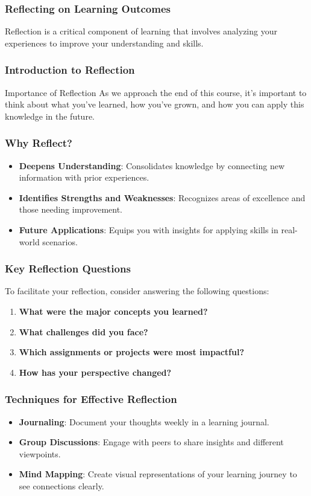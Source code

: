 \documentclass[aspectratio=169]{beamer}
\begin{document}
\begin{frame}[fragile]
  \frametitle{Reflecting on Learning Outcomes}
  Reflection is a critical component of learning that involves analyzing your experiences to improve your understanding and skills.
\end{frame}

\begin{frame}[fragile]
  \frametitle{Introduction to Reflection}
  \begin{block}{Importance of Reflection}
      As we approach the end of this course, it's important to think about what you've learned, how you've grown, and how you can apply this knowledge in the future.
  \end{block}
\end{frame}

\begin{frame}[fragile]
  \frametitle{Why Reflect?}
  \begin{itemize}
      \item \textbf{Deepens Understanding}: Consolidates knowledge by connecting new information with prior experiences.
      \item \textbf{Identifies Strengths and Weaknesses}: Recognizes areas of excellence and those needing improvement.
      \item \textbf{Future Applications}: Equips you with insights for applying skills in real-world scenarios.
  \end{itemize}
\end{frame}

\begin{frame}[fragile]
  \frametitle{Key Reflection Questions}
  To facilitate your reflection, consider answering the following questions:
  \begin{enumerate}
      \item \textbf{What were the major concepts you learned?}
      \item \textbf{What challenges did you face?}
      \item \textbf{Which assignments or projects were most impactful?}
      \item \textbf{How has your perspective changed?}
  \end{enumerate}
\end{frame}

\begin{frame}[fragile]
  \frametitle{Techniques for Effective Reflection}
  \begin{itemize}
      \item \textbf{Journaling}: Document your thoughts weekly in a learning journal.
      \item \textbf{Group Discussions}: Engage with peers to share insights and different viewpoints.
      \item \textbf{Mind Mapping}: Create visual representations of your learning journey to see connections clearly.
  \end{itemize}
\end{frame}
\end{document}
